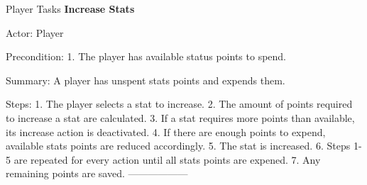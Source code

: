 \documentclass[12pt]{report}
\begin{document}
\begin {section}{Player Tasks}
\textbf{Increase Stats} %

Actor: Player

Precondition:
1. The player has available status points to spend.

Summary: A player has unspent stats points and expends them. 

Steps:
1. The player selects a stat to increase.
2. The amount of points required to increase a stat are calculated.
3. If a stat requires more points than available, its increase action is deactivated.
4. If there are enough points to expend, available stats points are reduced accordingly.
5. The stat is increased. 
6. Steps 1-5 are repeated for every action until all stats points are expened.
7. Any remaining points are saved.
------------------

\end{section}
\end{document}

